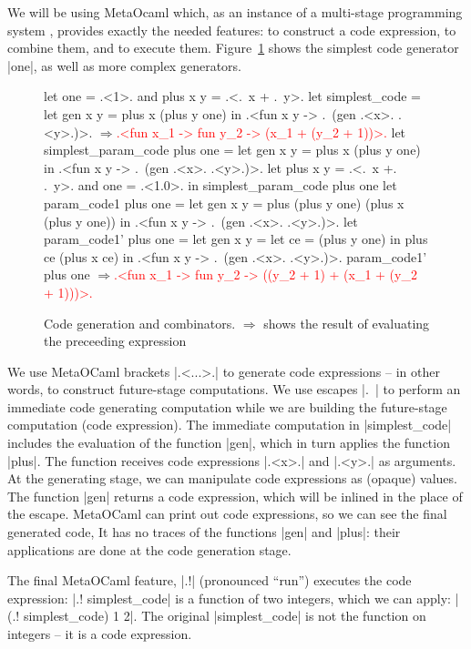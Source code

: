 \documentclass{llncs}
\newcommand{\evalresult}[1]{\ensuremath{\Longrightarrow}\textcolor{red}{#1}}
\begin{document}
We will be using MetaOcaml which, as an instance of a multi-stage
programming system \cite{TahaThesis}, provides exactly the needed
features: to construct a code expression, to combine them, and to
execute them. Figure~\ref{easycode} shows the simplest code generator |one|,
as well as more complex generators.

\begin{figure}\label{easycode}
\begin{code}
let one = .<1>. and plus x y = .<.~x + .~y>.
let simplest_code = let gen x y = plus x (plus y one) in
  .<fun x y -> .~(gen .<x>. .<y>.)>.
\evalresult{.<fun x_1 -> fun y_2 -> (x_1 + (y_2 + 1))>.}
let simplest_param_code plus one = let gen x y = plus x (plus y one) in
  .<fun x y -> .~(gen .<x>. .<y>.)>.
let plus x y = .<.~x +. .~y>. and one = .<1.0>. in
  simplest_param_code plus one
let param_code1 plus one =
  let gen x y = plus (plus y one) (plus x (plus y one)) in
  .<fun x y -> .~(gen .<x>. .<y>.)>.
let param_code1' plus one =
  let gen x y = let ce = (plus y one) in  plus ce (plus x ce) in
  .<fun x y -> .~(gen .<x>. .<y>.)>.
param_code1' plus one
\evalresult{.<fun x_1 -> fun y_2 -> ((y_2 + 1) + (x_1 + (y_2 + 1)))>.}
\end{code}
\caption{Code generation and combinators. $\Longrightarrow$ shows the
  result of evaluating the preceeding expression}
\end{figure}

We use MetaOCaml brackets |.<...>.| to generate code expressions -- in
other words, to construct future-stage computations. We use escapes
|.~| to perform an immediate code generating computation while we are
building the future-stage computation (code expression). The immediate
computation in |simplest_code| includes the evaluation of the function
|gen|, which in turn applies the function |plus|. The function
receives code expressions |.<x>.| and |.<y>.| as arguments. At the
generating stage, we can manipulate code expressions as (opaque)
values. The function |gen| returns a code expression, which will be
inlined in the place of the escape. MetaOCaml can print out code
expressions, so we can see the final generated code, It has
no traces of the functions |gen| and |plus|: their applications are
done at the code generation stage. 

The final MetaOCaml feature, |.!| (pronounced ``run'') 
executes the code expression: |.! simplest_code| is a function of two
integers, which we can apply: |(.! simplest_code) 1 2|. The original
|simplest_code| is not the function on integers -- it is a code
expression.
\end{document}

